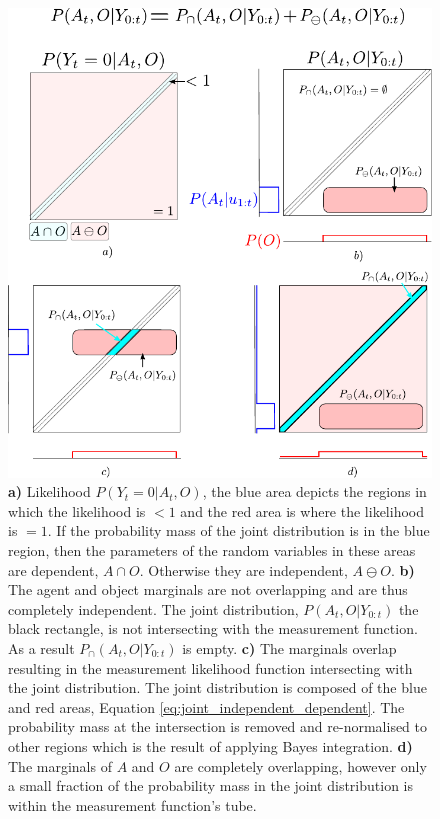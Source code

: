 %
 
 \begin{figure}
 \centering
  \includegraphics[width=\textwidth]{./ch5-MLMF/Figures/Figure7.pdf}
  \caption{
  \textbf{a)} Likelihood $P(Y_t=0|A_t,O)$, the blue area depicts the regions in which the likelihood is $<1$ 
  and the red area is where the likelihood is $=1$. If the probability mass of the joint distribution 
  is in the blue region, then the parameters of the random variables in these areas are dependent, $A \cap O$.
  Otherwise they are independent, $A \ominus O$.  
   \textbf{b)} The agent and object marginals are not overlapping and are thus completely independent. The joint distribution, 
   $P(A_t,O|Y_{0:t})$ the black rectangle,  is not intersecting with the measurement function. As a result $P_{\cap}(A_t,O|Y_{0:t})$
   is empty.
 \textbf{c)} The marginals overlap resulting in the measurement likelihood function intersecting with the joint distribution.
 The joint distribution is composed of the blue and red areas, Equation \ref{eq:joint_independent_dependent}.
 The probability mass at the intersection is removed and re-normalised to other regions which is the result of applying Bayes integration. 
 \textbf{d)} The marginals of $A$ and $O$ are completely overlapping, however only a small fraction of the probability mass 
 in the joint distribution is within the measurement function's tube.}
  \label{fig:overlap_dependence_independence}
\end{figure}

